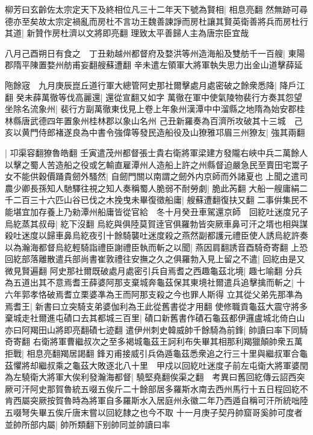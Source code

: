 柳芳曰玄齡佐太宗定天下及終相位凡三十二年天下號為賢相|{
	相息亮翻}
然無跡可尋德亦至矣故太宗定禍亂而房杜不言功王魏善諫諍而房杜讓其賢英衛善將兵而房杜行其道|{
	新贊作房杜濟以文將即亮翻}
理致太平善歸人主為唐宗臣宜哉

八月己酉朔日有食之　丁丑勑越州都督府及婺洪等州造海船及雙舫千一百艘|{
	東陽郡隋平陳置婺州舫甫妄翻艘蘇遭翻}
辛未遣左領軍大將軍執失思力出金山道擊薛延

陁餘宼　九月庚辰崑丘道行軍大總管阿史那社爾擊處月處密破之餘衆悉降|{
	降戶江翻}
癸未薛萬徹等伐高麗還|{
	還從宣翻又如字}
萬徹在軍中使氣陵物裴行方奏其怨望坐除名流象州|{
	裴行方副萬徹東伐見上卷上年象州漢潭中中溜縣之地隋為始安郡桂林縣唐武德四年置象州桂林郡以象山名州}
己丑新羅奏為百濟所攻破其十三城　己亥以黄門侍郎褚遂良為中書令強偉等發民造船役及山獠雅邛眉三州獠友|{
	強其兩翻}


|{
	卭渠容翻獠魯皓翻}
壬寅遣茂州都督張士貴右衛將軍梁建方發隴右峽中兵二萬餘人以擊之蜀人苦造船之役或乞輸直雇潭州人造船上許之州縣督迫嚴急民至賣田宅鬻子女不能供穀價踊貴劒外騷然|{
	自劒門關以南謂之劒外内京師而外諸夏也}
上聞之遣司農少卿長孫知人馳驛往視之知人奏稱蜀人脆弱不耐勞劇|{
	脆此芮翻}
大船一艘庸絹二千二百三十六匹山谷已伐之木挽曳未畢復徵船庸|{
	艘蘇遭翻復扶又翻}
二事倂集民不能堪宜加存養上乃勑潭州船庸皆從官給　冬十月癸丑車駕還京師　回紇吐迷度兄子烏紇蒸其叔母|{
	紇下沒翻}
烏紇與俱陸莫賀逹官俱羅勃皆突厥車鼻可汗之壻也相與謀殺吐迷度以歸車鼻烏紇夜引十餘騎襲吐迷度殺之燕然副都護元禮臣使人誘烏紇許奏以為瀚海都督烏紇輕騎詣禮臣謝禮臣執而斬之以聞|{
	燕因肩翻誘音酉騎奇寄翻}
上恐回紇部落離散遣兵部尚書崔敦禮往安撫之久之俱羅勃入見上留之不遣|{
	回紇由是又微見賢遍翻}
阿史那社爾既破處月處密引兵自焉耆之西趣龜茲北境|{
	趣七喻翻}
分兵為五道出其不意焉耆王薛婆阿那支棄城奔龜茲保其東境社爾遣兵追擊擒而斬之|{
	十六年郭孝恪破焉耆立栗婆凖為王而阿那支殺之今也罪人斯得}
立其從父弟先那凖為焉耆王|{
	新書曰立突騎支弟婆伽利為王此從舊書從才用翻}
使修職貢龜茲大震守將多棄城走社爾進屯磧口去其都城三百里|{
	磧口新舊書作磧石龜茲都伊邏盧城北倚白山亦曰阿羯田山將即亮翻磧七迹翻}
遣伊州刺史韓威帥千餘騎為前鋒|{
	帥讀曰率下同騎奇寄翻}
右衛將軍曹繼叔次之至多褐城龜茲王訶利布失畢其相那利羯獵顛帥衆五萬拒戰|{
	相息亮翻羯居謁翻}
鋒刃甫接威引兵偽遁龜茲悉衆追之行三十里與繼叔軍合龜茲懼將却繼叔乘之龜茲大敗逐北八十里　甲戍以回紇吐迷度子前左屯衛大將軍婆閏為左驍衛大將軍大俟利發瀚海都督|{
	驍堅堯翻俟渠之翻　考異曰舊回紇傳云詔西突厥可汗阿史那賀魯統五啜五俟斤二十餘部居多羅斯水南去西州馬行十五日程回紇不肯西屬突厥按賀魯時為將軍自多羅斯水入居庭州永徽二年乃西遁自稱可汗所統咄陸五啜弩失畢五俟斤唐末嘗以回紇隸之也今不取}
十一月庚子契丹帥窟哥奚帥可度者並帥所部内屬|{
	帥所類翻下别帥同並帥讀曰率}
